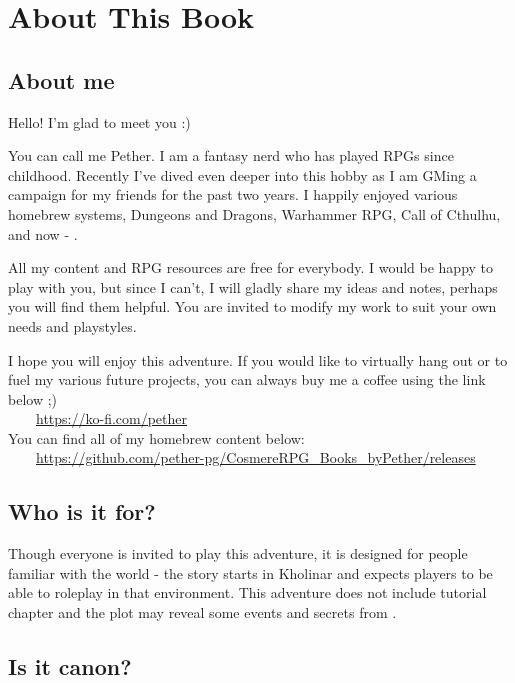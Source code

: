 \section{About This Book}

\subsection{About me}

Hello! I'm glad to meet you :)

You can call me Pether. I am a fantasy nerd who has played RPGs since childhood. Recently I've dived even deeper into this hobby as I am GMing a campaign for my friends for the past two years. I happily enjoyed various homebrew systems, Dungeons and Dragons, Warhammer RPG, Call of Cthulhu, and now - \cosmereRPG{}.

All my content and RPG resources are free for everybody. I would be happy to play with you, but since I can't, I will gladly share my ideas and notes, perhaps you will find them helpful. You are invited to modify my work to suit your own needs and playstyles. 

I hope you will enjoy this adventure. If you would like to virtually hang out or to fuel my various future projects, you can always buy me a coffee using the link below ;) \\

~~~~\url{https://ko-fi.com/pether} \\

You can find all of my \cosmereRPG{} homebrew content below: \\

~~~~\url{https://github.com/pether-pg/CosmereRPG_Books_byPether/releases}

\subsection{Who is it for?}

Though everyone is invited to play this adventure, it is designed for people familiar with the world - the story starts in Kholinar and expects players to be able to roleplay in that environment. This adventure does not include tutorial chapter and the plot may reveal some events and secrets from \bookSA{}.

\subsection{Is it canon?}

